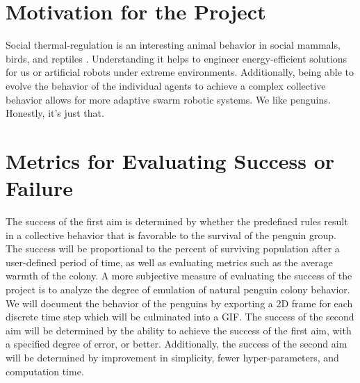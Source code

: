 \documentclass[12pt]{article}
\begin{document}
	\vspace{-10pt}
	\section*{Motivation for the Project}
	\vspace{-6pt}
	\par Social thermal-regulation is an interesting animal behavior in social
	mammals, birds, and reptiles \cite{campbell_social_2018}.
	Understanding it helps to engineer energy-efficient solutions for us or
	artificial robots under extreme environments.
	Additionally, being able to evolve the behavior of the individual agents to
	achieve a complex collective behavior allows for more adaptive swarm
	robotic systems.
	We like penguins.
	Honestly, it's just that.

	\vspace{-10pt}
	\section*{Metrics for Evaluating Success or Failure}
	\vspace{-6pt}
	\par The success of the first aim is determined by whether the predefined
	rules result in a collective behavior that is favorable to the survival of
	the penguin group.
	The success will be proportional to the percent of surviving population
	after a user-defined period of time, as well as evaluating metrics such as
	the average warmth of the colony.
	A more subjective measure of evaluating the success of the project is to
	analyze the degree of emulation of natural penguin colony behavior.
	We will document the behavior of the penguins by exporting a 2D frame for
	each discrete time step which will be culminated into a GIF.
	The success of the second aim will be determined by the ability to achieve
	the success of the first aim, with a specified degree of error, or better.
	Additionally, the success of the second aim will be determined by
	improvement in simplicity, fewer hyper-parameters, and computation time.

	\vspace{-10pt}
	\printbibliography
\end{document}
